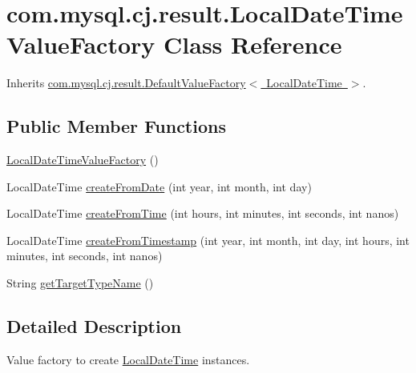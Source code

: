 \hypertarget{classcom_1_1mysql_1_1cj_1_1result_1_1_local_date_time_value_factory}{}\section{com.\+mysql.\+cj.\+result.\+Local\+Date\+Time\+Value\+Factory Class Reference}
\label{classcom_1_1mysql_1_1cj_1_1result_1_1_local_date_time_value_factory}


Inherits \mbox{\hyperlink{classcom_1_1mysql_1_1cj_1_1result_1_1_default_value_factory}{com.\+mysql.\+cj.\+result.\+Default\+Value\+Factory$<$ Local\+Date\+Time $>$}}.

\subsection*{Public Member Functions}
\begin{DoxyCompactItemize}
\item 
\mbox{\hyperlink{classcom_1_1mysql_1_1cj_1_1result_1_1_local_date_time_value_factory_a231de5147ced9434d94ef55f0d002cb7}{Local\+Date\+Time\+Value\+Factory}} ()
\item 
Local\+Date\+Time \mbox{\hyperlink{classcom_1_1mysql_1_1cj_1_1result_1_1_local_date_time_value_factory_acc1132dc0e12080882860fa3e4449594}{create\+From\+Date}} (int year, int month, int day)
\item 
Local\+Date\+Time \mbox{\hyperlink{classcom_1_1mysql_1_1cj_1_1result_1_1_local_date_time_value_factory_a19f3b513bc3edf16cf9958886c6b2233}{create\+From\+Time}} (int hours, int minutes, int seconds, int nanos)
\item 
Local\+Date\+Time \mbox{\hyperlink{classcom_1_1mysql_1_1cj_1_1result_1_1_local_date_time_value_factory_a581f20c2279af34eb22091352a12271b}{create\+From\+Timestamp}} (int year, int month, int day, int hours, int minutes, int seconds, int nanos)
\item 
String \mbox{\hyperlink{classcom_1_1mysql_1_1cj_1_1result_1_1_local_date_time_value_factory_a900e37dad9b8f0167f8dc251ebe72846}{get\+Target\+Type\+Name}} ()
\end{DoxyCompactItemize}


\subsection{Detailed Description}
Value factory to create \mbox{\hyperlink{}{Local\+Date\+Time}} instances. 

